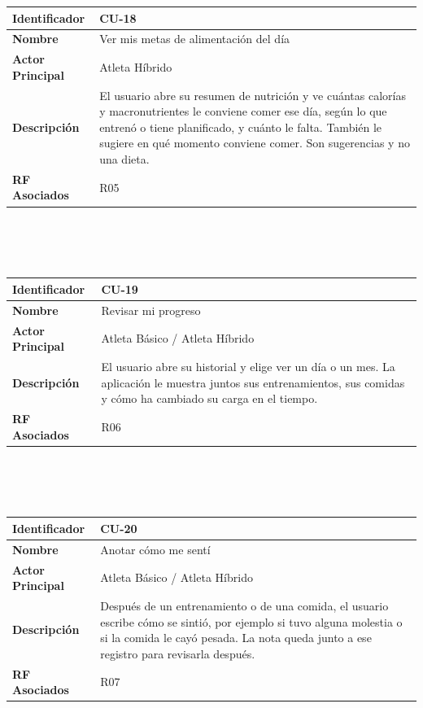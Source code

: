 \newpage
\begin{tabular}{|p{3.5cm}|p{11.5cm}|}
    \hline
    \rowcolor[HTML]{EFEFEF}
    \textbf{Identificador} & \textbf{CU-18} \\ \hline
    \textbf{Nombre} & Ver mis metas de alimentación del día \\ \hline
    \textbf{Actor Principal} & Atleta Híbrido \\ \hline
    \textbf{Descripción} & El usuario abre su resumen de nutrición y ve cuántas calorías y macronutrientes le conviene comer ese día, según lo que entrenó o tiene planificado, y cuánto le falta. También le sugiere en qué momento conviene comer. Son sugerencias y no una dieta. \\ \hline
    \textbf{RF Asociados} & R05 \\ \hline
\end{tabular}
\\\\\\
\begin{tabular}{|p{3.5cm}|p{11.5cm}|}
    \hline
    \rowcolor[HTML]{EFEFEF}
    \textbf{Identificador} & \textbf{CU-19} \\ \hline
    \textbf{Nombre} & Revisar mi progreso \\ \hline
    \textbf{Actor Principal} & Atleta Básico / Atleta Híbrido \\ \hline
    \textbf{Descripción} & El usuario abre su historial y elige ver un día o un mes. La aplicación le muestra juntos sus entrenamientos, sus comidas y cómo ha cambiado su carga en el tiempo. \\ \hline
    \textbf{RF Asociados} & R06 \\ \hline
\end{tabular}
\\\\\\
\begin{tabular}{|p{3.5cm}|p{11.5cm}|}
    \hline
    \rowcolor[HTML]{EFEFEF}
    \textbf{Identificador} & \textbf{CU-20} \\ \hline
    \textbf{Nombre} & Anotar cómo me sentí \\ \hline
    \textbf{Actor Principal} & Atleta Básico / Atleta Híbrido \\ \hline
    \textbf{Descripción} & Después de un entrenamiento o de una comida, el usuario escribe cómo se sintió, por ejemplo si tuvo alguna molestia o si la comida le cayó pesada. La nota queda junto a ese registro para revisarla después. \\ \hline
    \textbf{RF Asociados} & R07 \\ \hline
\end{tabular}
